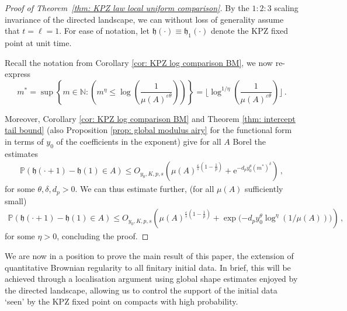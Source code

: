 \documentclass[11pt, reqno]{amsart}
\numberwithin{equation}{section}
\newcommand{\PP}{\ensuremath{\mathbb{P}}}
\begin{document}
\begin{proof}[Proof of Theorem~\ref{thm: KPZ law local uniform comparison}]
By the $1:2:3$ scaling invariance of the directed landscape, we can without loss of generality assume that $t = 
\ell = 1$. For ease of notation, let $\mathfrak{h}(\cdot)\equiv \mathfrak{h}_1(\cdot)$ denote the KPZ fixed point at unit time.

Recall the notation from Corollary \ref{cor: KPZ log comparison BM}, we now re-express
\begin{equation*}
m^* =  \displaystyle \sup \left\{m\in \mathbb{N} :  \left(m^\eta \le \log \left(\frac{1}{ \mu(A)^{\varepsilon\theta}}\right)\right)\right\}=\bigg\lfloor \log^{1/\eta} \left(\frac{1}{ \mu(A)^{\varepsilon\theta}}\right)\bigg\rfloor\,.
\end{equation*}

Moreover, Corollary \ref{cor: KPZ log comparison BM} and Theorem \ref{thm: intercept tail bound} (also Proposition \ref{prop: global modulus airy} for the functional form in terms of $y_0$ of the coefficients in the exponent) give for all $A$ Borel the estimates
\begin{equation*}
\begin{array}{cc}
     \PP(\mathfrak{h}(\cdot + 1)-\mathfrak{h}(1)\in A) \le O_{y_0, K, p,s}\left(\mu(A)^{\frac{\varepsilon}{s}(1-\frac{1}{p})} + \mathrm{e}^{-d_p y_0^\theta(m^*)^\delta}\right)\,,
\end{array}
\end{equation*}
for some $\theta, \delta, d_p > 0$. We can thus estimate further, (for all $\mu(A)$ sufficiently small)
\begin{equation*}
\begin{array}{cc}
     \PP(\mathfrak{h}(\cdot + 1)-\mathfrak{h}(1)\in A) \le O_{y_0, K, p,s}\left(\mu(A)^{\frac{\varepsilon}{s}(1-\frac{1}{p})} + \exp\bigg({-d_p y_0^\theta  \log^{\eta} \left(1/\mu(A)\right)}\bigg)\right)\,,
\end{array}
\end{equation*} 
for some $\eta> 0$, concluding the proof.
\end{proof}

We are now in a position to prove the main result of this paper, the extension of quantitative Brownian regularity to all finitary initial data. In brief, this will be achieved through a localisation argument using global shape estimates enjoyed by the directed landscape, allowing us to control the support of the initial data `seen' by the KPZ fixed point on compacts with high probability.
\end{document}
